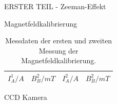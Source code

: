 \begin{appendix}
  \label{Anhang}
  
  
  
  \begin{chapter}{ERSTER TEIL - Zeeman-Effekt}
    \label{Anhang:chp:Zeeman}
    
    
    
    \begin{section}{Magnetfeldkalibrierung}
      \label{Anhang:chp:Zeemanmagnetfeld}
      
      \begin{table}[htbp]
        \centering
        \footnotesize
        \begin{tabular}{|c|c|c|c|}
          \hline
          $I_{A}^{1}/A$ & $B_{B}^{2}/mT$ & $I_{A}^{2}/A$ & $B_{B}^{2}/mT$ 
              \\ \hline
          
        \end{tabular}
        \caption{Messdaten der ersten und zweiten Messung der 
            Magnetfeldkalibrierung.}
        \label{tab:Magnetfeldkalibrierung}
      \end{table}
      
    \end{section}
    
    
    
    \begin{section}{CCD Kamera}
      \label{Anhang:chp:Zeemanccd}
      

\end{section}
\end{chapter}
\end{appendix}

